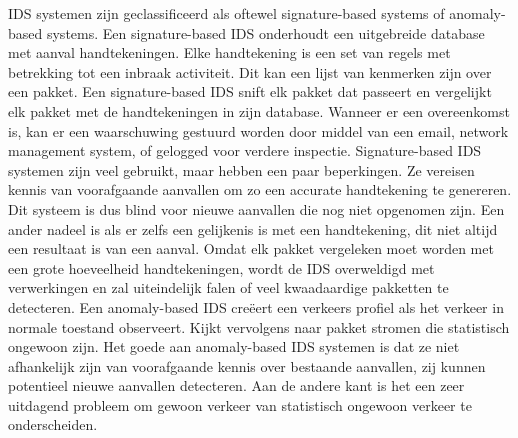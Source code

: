 IDS systemen zijn geclassificeerd als oftewel signature-based systems of anomaly-based systems. Een signature-based IDS onderhoudt een uitgebreide database met aanval handtekeningen. Elke handtekening is een set van regels met betrekking tot een inbraak activiteit. Dit kan een lijst van kenmerken zijn over een pakket. Een signature-based IDS snift elk pakket dat passeert en vergelijkt elk pakket met de handtekeningen in zijn database. Wanneer er een overeenkomst is, kan er een waarschuwing gestuurd worden door middel van een email, network management system, of gelogged voor verdere inspectie. Signature-based IDS systemen zijn veel gebruikt, maar hebben een paar beperkingen. Ze vereisen kennis van voorafgaande aanvallen om zo een accurate handtekening te genereren. Dit systeem is dus blind voor nieuwe aanvallen die nog niet opgenomen zijn. Een ander nadeel is als er zelfs een gelijkenis is met een handtekening, dit niet altijd een resultaat is van een aanval. Omdat elk pakket vergeleken moet worden met een grote hoeveelheid handtekeningen, wordt de IDS overweldigd met verwerkingen en zal uiteindelijk falen of veel kwaadaardige pakketten te detecteren.
Een anomaly-based IDS creëert een verkeers profiel als het verkeer in normale toestand observeert. Kijkt vervolgens naar pakket stromen die statistisch ongewoon zijn. Het goede aan anomaly-based IDS systemen is dat ze niet afhankelijk zijn van voorafgaande kennis over bestaande aanvallen, zij kunnen potentieel nieuwe aanvallen detecteren. Aan de andere kant is het een zeer uitdagend probleem om gewoon verkeer van statistisch ongewoon verkeer te onderscheiden.
